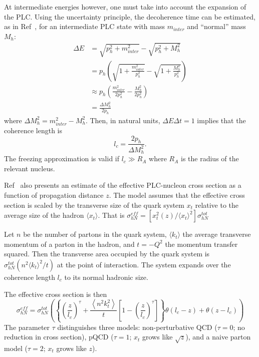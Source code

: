 At intermediate energies however, one must take into account the expansion of
the PLC.
Using the uncertainty principle, the decoherence time can be
estimated, as in Ref~\cite{Farrar_1988}, for an intermediate PLC state with mass
$m_{inter}$ and ``normal'' mass $M_h$:
\begin{align}
    \Delta E &= \sqrt{p_h^2 + m_{inter}^2} - \sqrt{p_h^2 + M_h^2} \\
             &= p_h \left( \sqrt{1+\frac{m_{inter}^2}{p_h^2}} -
                           \sqrt{1+\frac{M_h^2}{p_h^2}} \right) \\
             &\approx p_h \left( \frac{m_{inter}^2}{2p_h^2} - \frac{M_h^2}{2p_h^2} \right) \\
             &= \frac{\Delta M_h^2}{2p_h}
\end{align}
where $\Delta M_h^2 = m_{inter}^2 - M_h^2$.
Then, in natural units, $\Delta E \Delta t = 1$ implies that the coherence
length is
\begin{equation}
    l_c = \frac{2p_h}{\Delta M_h^2}.
\end{equation}
The freezing approximation is valid if $l_c \gg R_A$ where $R_A$ is the radius of
the relevant nucleus.


Ref~\cite{Farrar_1988} also presents an estimate of the effective PLC-nucleon
cross section as a function of propagation distance $z$.
The model assumes that the effective cross section is scaled by the transverse
size of the quark system $x_t$ relative to the average size of the hadron
$\langle x_t \rangle$.
That is
$\sigma^{eff}_{hN} = \left[ x^2_t(z) / \langle x_t \rangle^2 \right] \sigma^{tot}_{hN}$


Let $n$ be the number of partons in the quark system,
$\langle k_t \rangle$ the average transverse momentum of a parton in the
hadron, and $t=-Q^2$ the momentum transfer squared.
Then the transverse area occupied by the quark system is
$\sigma^{tot}_{hN}(n^2 \langle k_t \rangle^2 / t)$ at the point of interaction.
The system expands over the coherence length $l_c$ to its normal hadronic size.


The effective cross section is then
\begin{equation}
    \sigma_{hN}^{eff} = \sigma_{hN}^{tot}
    \left(
        \left\{\left(\frac{z}{l_c}\right)^{\tau} +
               \frac{\left\langle n^{2} k_{t}^{2}\right\rangle}{t} \left[1-\left(\frac{z}{l_c}\right)^{\tau}\right]
        \right\}
        \theta\left(l_c-z\right) +
        \theta\left(z-l_c\right)
    \right)
\end{equation}
The parameter $\tau$ distinguishes three models:
non-perturbative QCD ($\tau=0$; no reduction in cross section),
pQCD ($\tau=1$; $x_t$ grows like $\sqrt{z}$), and
a naive parton model ($\tau=2$; $x_t$ grows like $z$).


